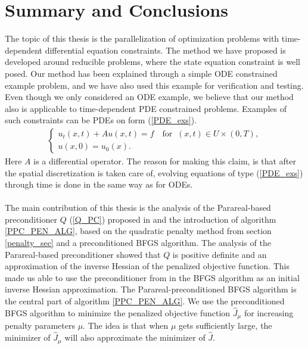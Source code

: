 \chapter{Summary and Conclusions} \label{summary chap}
The topic of this thesis is the parallelization of optimization problems with time-dependent differential equation constraints. The method we have proposed is developed around reducible problems, where the state equation constraint is well posed. Our method has been explained through a simple ODE constrained example problem, and we have also used this example for verification and testing. Even though we only considered an ODE example, we believe that our method also is applicable to time-dependent PDE constrained problems. Examples of such constraints can be PDEs on form (\ref{PDE_exs}).
\begin{align}
\left\{
     \begin{array}{lr}
       	u_t(x,t) + Au(x,t)=f \quad \textrm{for } \ (x,t)\in U\times(0,T),\\
       	u(x,0)=u_0(x).
     \end{array}
   \right. \label{PDE_exs}
\end{align}
Here $A$ is a differential operator. The reason for making this claim, is that after the spatial discretization is taken care of, evolving equations of type (\ref{PDE_exs}) through time is done in the same way as for ODEs. 
\\
\\
The main contribution of this thesis is the analysis of the Parareal-based preconditioner $Q$ (\ref{Q_PC}) proposed in \cite{maday2002parareal} and the introduction of algorithm \ref{PPC_PEN_ALG}, based on the quadratic penalty method from section \ref{penalty_sec} and a preconditioned BFGS algorithm. The analysis of the Parareal-based preconditioner showed that $Q$ is positive definite and an approximation of the inverse Hessian of the penalized objective function. This made us able to use the preconditioner from \cite{maday2002parareal} in the BFGS algorithm as an initial inverse Hessian approximation. The Parareal-preconditioned BFGS algorithm is the central part of algorithm \ref{PPC_PEN_ALG}. We use the preconditioned BFGS algorithm to minimize the penalized objective function $\hat J_{\mu}$ for increasing penalty parameters $\mu$. The idea is that when $\mu$ gets sufficiently large, the minimizer of $\hat J_{\mu}$ will also approximate the minimizer of $\hat J$.
\\
\\
